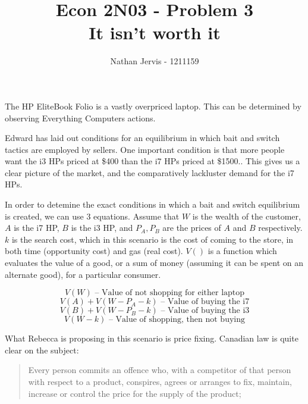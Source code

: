 \documentclass[12pt]{article}
\title{\vspace{-3.5cm}Econ 2N03 - Problem 3\\It isn't worth it}
\author{Nathan Jervis - 1211159}
\newcommand\explain[1]{\text{  --  #1}}
\begin{document}
\maketitle


The HP EliteBook Folio is a vastly overpriced laptop. This can be determined by observing Everything Computers actions.

Edward\cite{baitSwitch} has laid out conditions for an equilibrium in which bait and switch tactics are employed by sellers. One important condition is that more people want the i3 HPs priced at \$400 than the i7 HPs priced at \$1500.\cite[pg. 818]{baitSwitch}. This gives us a clear picture of the market, and the comparatively lackluster demand for the i7 HPs.

In order to detemine the exact conditions in which a bait and switch equilibrium is created, we can use 3 equations. Assume that $W$ is the wealth of the customer, $A$ is the i7 HP, $B$ is the i3 HP, and $P_A, P_B$ are the prices of $A$ and $B$ respectively. $k$ is the search cost, which in this scenario is the cost of coming to the store, in both time (opportunity cost) and gas (real cost). $V()$ is a function which evaluates the value of a good, or a sum of money (assuming it can be spent on an alternate good), for a particular consumer.

\begin{equation}
	V(W) \explain{Value of not shopping for either laptop}
\end{equation}
\begin{equation}
	V(A) + V(W-P_A - k) \explain{Value of buying the i7}
\end{equation}
\begin{equation}
	V(B) + V(W-P_B - k) \explain{Value of buying the i3}
\end{equation}
\begin{equation}
	V(W-k) \explain{Value of shopping, then not buying}
\end{equation}



What Rebecca is proposing in this scenario is price fixing. Canadian law is quite clear on the subject: \cite[45.1.a]{compAct}

\begin{quotation}
Every person commits an offence who, with a competitor of that person with respect to a product, conspires, agrees or arranges to fix, maintain, increase or control the price for the supply of the product;
\end{quotation}
\end{document}
